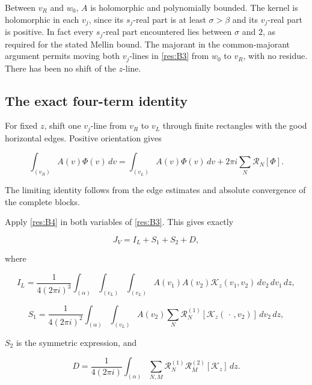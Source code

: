 \documentclass[11pt]{article}
\numberwithin{equation}{section}
\begin{document}
Between \(v_R\) and \(w_0\), \(A\) is holomorphic and polynomially
bounded. The kernel is holomorphic in each \(v_j\), since its
\(s_j\)-real part is at least \(\sigma>\beta\) and its \(v_j\)-real part
is positive. In fact every \(s_j\)-real part encountered lies between
\(\sigma\) and \(2\), as required for the stated Mellin bound. The
majorant in the common-majorant argument permits moving both
\(v_j\)-lines in \eqref{res:B3} from \(w_0\) to \(v_R\), with no
residue. There has been no shift of the \(z\)-line.

\subsection{The exact four-term
identity}\label{the-exact-four-term-identity}

For fixed \(z\), shift one \(v_j\)-line from \(v_R\) to \(v_L\) through
finite rectangles with the good horizontal edges. Positive orientation
gives

\begin{equation}\label{res:B4}
\int_{(v_R)} A(v)\Phi(v)\,dv
 =
 \int_{(v_L)} A(v)\Phi(v)\,dv
 +2\pi i\sum_N\mathcal R_N[\Phi].
\end{equation}

The limiting identity follows from the edge estimates and absolute
convergence of the complete blocks.

Apply \eqref{res:B4} in both variables of \eqref{res:B3}. This gives
exactly

\begin{equation}\label{res:B5}
J_V=I_L+S_1+S_2+D,
\end{equation}

where

\begin{equation}\label{res:B6}
I_L=\frac1{4(2\pi i)^3}
 \int_{(\alpha)}\int_{(v_L)}\int_{(v_L)}
 A(v_1)A(v_2)\mathcal K_z(v_1,v_2)\,dv_2\,dv_1\,dz,
\end{equation}

\begin{equation}\label{res:B7}
S_1=\frac1{4(2\pi i)^2}
 \int_{(\alpha)}\int_{(v_L)}
 A(v_2)\sum_N\mathcal R_N^{(1)}
       [\mathcal K_z(\,\cdot\,,v_2)]\,dv_2\,dz,
\end{equation}

\(S_2\) is the symmetric expression, and

\begin{equation}\label{res:B8}
D=\frac1{4(2\pi i)}
 \int_{(\alpha)}
 \sum_{N,M}\mathcal R_N^{(1)}\mathcal R_M^{(2)}
       [\mathcal K_z]\,dz.
\end{equation}
\end{document}

